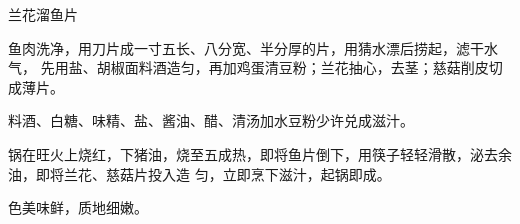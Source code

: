 \begin{recipe}{兰花溜鱼片}

\ingredients


\preparation

\step 鱼肉洗净，用刀片成一寸五长、八分宽、半分厚的片，用猜水漂后捞起，滤干水气，
先用盐、胡椒面料酒造匀，再加鸡蛋清豆粉；兰花抽心，去茎；慈菇削皮切成薄片。

\step 料酒、白糖、味精、盐、酱油、醋、清汤加水豆粉少许兑成滋汁。

\step 锅在旺火上烧红，下猪油，烧至五成热，即将鱼片倒下，用筷子轻轻滑散，泌去余
油，即将兰花、慈菇片投入造 匀，立即烹下滋汁，起锅即成。

\features

色美味鲜，质地细嫩。

\end{recipe}

